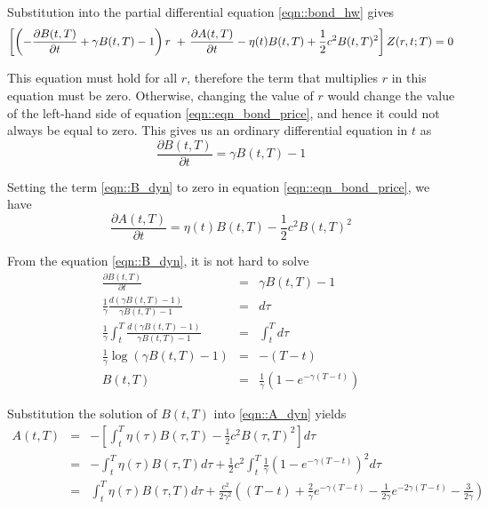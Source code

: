 \documentclass[a4paper,11pt] {article}
\begin{document}
Substitution into the partial differential equation \ref{eqn::bond_hw} gives
\begin{equation} \label{eqn::eqn_bond_price}
\left[ \left( - \frac{\partial B(t,T)}{\partial t} + \gamma B(t,T) - 1 \right)r  \right. \\
+  \left. \frac{\partial A(t,T)}{\partial t}-\eta(t)B(t,T) +  \frac{1}{2}c^2 B(t,T)^2 \right]Z(r,t;T) = 0
\end{equation}

This equation must hold for all $r$, therefore the term that multiplies $r$ in this equation must be zero. Otherwise, changing the value of $r$ would change the value of the left-hand side of equation \ref{eqn::eqn_bond_price}, and hence it could not always be equal to zero. This gives us an ordinary differential equation in $t$ as
\begin{equation} \label{eqn::B_dyn}
\frac{\partial B(t,T)}{\partial t} = \gamma B(t,T) - 1
\end{equation}

Setting the term \ref{eqn::B_dyn} to zero in equation \ref{eqn::eqn_bond_price}, we have
\begin{equation} \label{eqn::A_dyn}
\frac{\partial A(t,T)}{\partial t} = \eta(t)B(t,T) -  \frac{1}{2}c^2 B(t,T)^2
\end{equation}

From the equation \ref{eqn::B_dyn}, it is not hard to solve
\begin{eqnarray*}
\frac{\partial B(t,T)}{\partial t} &=& \gamma B(t,T) - 1 \\
\frac{1}{\gamma} \frac{d (\gamma B(t,T) -1)}{\gamma B(t,T) -1} &=& d\tau \\
\frac{1}{\gamma} \int_t^T \frac{d (\gamma B(t,T) -1)}{\gamma B(t,T) -1} &=& \int_t^T d\tau \\
\frac{1}{\gamma} \log(\gamma B(t,T)-1) &=& - (T-t) \\
B(t,T) &=& \frac{1}{\gamma} \left( 1 - e^{-\gamma (T-t)} \right)
\end{eqnarray*}

Substitution the solution of $B(t,T)$ into \ref{eqn::A_dyn} yields
\begin{eqnarray*}
A(t,T) &=& - \left[ \int_t^T \eta(\tau)B(\tau,T) -  \frac{1}{2}c^2 B(\tau,T)^2 \right] d\tau \\
       &=& - \int_t^T \eta(\tau)B(\tau,T)d\tau + \frac{1}{2}c^2 \int_t^T \frac{1}{\gamma} \left( 1 - e^{-\gamma (T-t)} \right)^2 d\tau \\
       &=&  \int_t^T \eta(\tau)B(\tau,T)d\tau + \frac{c^2}{2\gamma^2} \left( (T-t) + \frac{2}{\gamma} e^{-\gamma(T-t)} -\frac{1}{2\gamma}e^{-2\gamma(T-t)} -\frac{3}{2\gamma} \right)
\end{eqnarray*}
\end{document}
